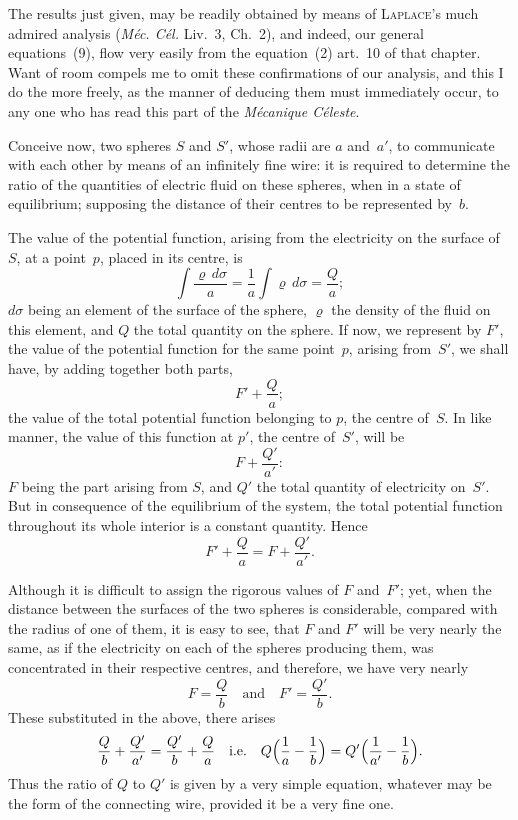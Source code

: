 \documentclass[12pt,notitlepage]{amsart}
\let\Person\textsc
\let\Title\textit
\renewcommand{\rho}{\varrho}
\begin{document}
The results just given, may be readily obtained by means of \Person{Laplace}'s
much admired analysis
(\Title{M\'ec. C\'el.} Liv.~3, Ch.~2), and indeed, our general
equations~(9), flow very easily from the equation~(2) art.~10 of that chapter.
Want of room compels me to omit these confirmations of our analysis, and
this I do the more freely, as the manner of deducing them must immediately
occur, to any one who has read this part of the \Title{M\'ecanique C\'eleste}.

Conceive now, two spheres $S$ and $S'$, whose radii are $a$ and~$a'$, to
communicate with each other by means of an infinitely fine wire: it is required
to determine the ratio of the quantities of electric fluid on these spheres,
when in a state of equilibrium; supposing the distance of their centres to be
represented by~$b$.

The value of the potential function, arising from the electricity on the
surface of~$S$, at a point~$p$, placed in its centre, is
\[
\int\frac{\rho\,d\sigma}{a}=\frac1a\int\rho\,d\sigma=\frac{Q}{a};
\]
$d\sigma$ being an element of the surface of the sphere,
$\rho$ the density of the fluid
on this element, and $Q$ the total quantity on the sphere. If now, we
represent by $F'$, the value of the potential function for the same point~$p$,
arising from~$S'$, we shall have, by adding together both parts,
\[
F'+\frac{Q}{a};
\]
the value of the total potential function belonging to $p$, the centre of~$S$.
In
like manner, the value of this function at $p'$, the centre of~$S'$, will be
\[
F+\frac{Q'}{a'}:
\]
$F$ being the part arising from $S$,
and $Q'$ the total quantity of electricity on~$S'$.
But in consequence of the equilibrium of the system,
the total potential function
throughout its whole interior is a constant quantity. Hence
\[
F'+\frac{Q}{a}
=F+\frac{Q'}{a'}.
\]

Although it is difficult to assign the rigorous values of $F$ and~$F'$;
yet, when the distance between the surfaces of the two spheres is considerable,
compared with the radius of one of them, it is easy to see, that
$F$ and $F'$ will be very nearly the same, as if the electricity on each of the
spheres producing them, was concentrated in their respective centres, and
therefore, we have very nearly
\[
F=\frac{Q}{b}
\quad\text{and}\quad
F'=\frac{Q'}{b}.
\]
These substituted in the above, there arises
\[
\frac{Q}{b}+\frac{Q'}{a'}=\frac{Q'}{b}+\frac{Q}{a}
\quad\text{i.e.}\quad
Q\Bigl(\frac1a-\frac1b\Bigr)=Q'\Bigl(\frac1{a'}-\frac1b\Bigr).
\]
Thus the ratio of $Q$ to $Q'$ is given by a very simple equation, whatever
may be the form of the connecting wire, provided it be a very fine one.
\end{document}
